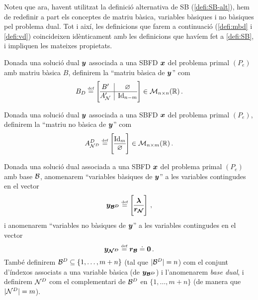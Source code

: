 Noteu que ara, havent utilitzat la definició alternativa de SB 
(\ref{defi:SB-alt}), hem de redefinir a part els conceptes de matriu bàsica, 
variables bàsiques i no bàsiques pel problema dual. Tot i així, les definicions 
que farem a continuació (\ref{defi:mbd} i \ref{defi:vd}) coincideixen 
idènticament amb les definicions que havíem fet a \ref{defi:SB}, i impliquen 
les mateixes propietats.

\begin{defi*}\label{defi:mbd}
	Donada una solució dual $\boldsymbol{y}$ associada a una SBFD $\boldsymbol{x}$ del problema 
	primal $(P_e)$ amb matriu bàsica $B$, definirem la ``matriu bàsica de 
	$\boldsymbol{y}$'' com
	\[
	B_D \defeq \left[
	\begin{array}{@{}c|c@{}}
	B'	  &	\varnothing	\\
	\hline
	A_\N' & \Id_{n-m}
	\end{array}
	\right]
	\in \matspace_{n\times n}(\real)  \,.
	\]
\end{defi*}

\begin{defi*}
	Donada una solució dual $\boldsymbol{y}$ associada a una SBFD $\boldsymbol{x}$ del problema 
	primal $(P_e)$, definirem la ``matriu no bàsica de  $\boldsymbol{y}$'' com
	\[
	A^D_{\N^D} \defeq 
	\left[
	\begin{array}{@{}c@{}}
	\Id_m \\
	\hline
	\varnothing
	\end{array}
	\right]
	\in \matspace_{n\times m}(\real)\,.
	\]
\end{defi*}

\begin{defi*}\label{defi:vd}
	Donada una solució dual associada a una SBFD $\boldsymbol{x}$ del problema primal 
	$(P_e)$ amb base $\mathcal{B}$, anomenarem ``variables bàsiques de $\boldsymbol{y}$'' a les 
	variables contingudes en el vector
	\[
	\vb{y_{\B^D}} \defeq
	\left[\begin{array}{@{}c@{}}
	\vb{\lambda}\\
	\hline
	\vb{r_\N}
	\end{array}\right]\,,
	\]
	i anomenarem ``variables no bàsiques de $\boldsymbol{y}$'' a les variables 
	contingudes en el vector
	\[
	\boldsymbol{y_{\mathcal{N}^D}} \stackrel{\text{\tiny def}}{=} \boldsymbol{r_{\mathcal{B}}} \doteq \boldsymbol{0}\,.
	\]
	També definirem $\mathcal{B}^D \subseteq \{1,\ldots, m+n\}$ (tal que $|\mathcal{B}^D| = n$) 
	com el conjunt d'índexos associats a una variable bàsica (de 
	$\boldsymbol{y_{\mathcal{B}^D}}$) i l'anomenarem \textit{base dual}, i definirem $\mathcal{N}^D$ com 
	el complementari de $\mathcal{B}^D$ en $\{1,\ldots,m+n\}$ (de manera que $|\mathcal{N}^D|=m$).
\end{defi*}


